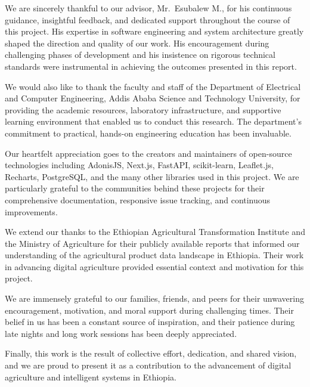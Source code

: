 \documentclass[12pt,a4paper,oneside]{report}
\begin{document}
We are sincerely thankful to our advisor, Mr.\ Esubalew M., for his continuous guidance, insightful feedback, and dedicated support throughout the course of this project. His expertise in software engineering and system architecture greatly shaped the direction and quality of our work. His encouragement during challenging phases of development and his insistence on rigorous technical standards were instrumental in achieving the outcomes presented in this report.

We would also like to thank the faculty and staff of the Department of Electrical and Computer Engineering, Addis Ababa Science and Technology University, for providing the academic resources, laboratory infrastructure, and supportive learning environment that enabled us to conduct this research. The department's commitment to practical, hands-on engineering education has been invaluable.

Our heartfelt appreciation goes to the creators and maintainers of open-source technologies including AdonisJS, Next.js, FastAPI, scikit-learn, Leaflet.js, Recharts, PostgreSQL, and the many other libraries used in this project. We are particularly grateful to the communities behind these projects for their comprehensive documentation, responsive issue tracking, and continuous improvements.

We extend our thanks to the Ethiopian Agricultural Transformation Institute and the Ministry of Agriculture for their publicly available reports that informed our understanding of the agricultural product data landscape in Ethiopia. Their work in advancing digital agriculture provided essential context and motivation for this project.

We are immensely grateful to our families, friends, and peers for their unwavering encouragement, motivation, and moral support during challenging times. Their belief in us has been a constant source of inspiration, and their patience during late nights and long work sessions has been deeply appreciated.

Finally, this work is the result of collective effort, dedication, and shared vision, and we are proud to present it as a contribution to the advancement of digital agriculture and intelligent systems in Ethiopia.

\tableofcontents
\newpage
\end{document}

